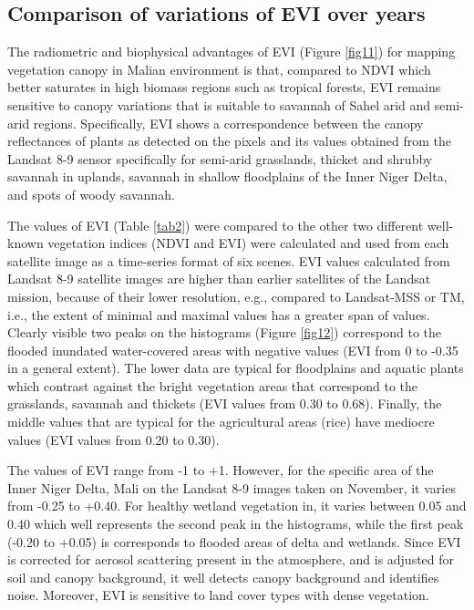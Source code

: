 \documentclass[12pt,a4paper,oneside]{article}
\def \newpar{\vspace{6pt}}
\begin{document}
\subsection*{Comparison of variations of EVI over years}

\newpar The radiometric and biophysical advantages of EVI (Figure \ref{fig11}) for mapping vegetation canopy in Malian environment is that, compared to NDVI which better saturates in high biomass regions such as tropical forests, EVI remains sensitive to canopy variations that is suitable to savannah of Sahel arid and semi-arid regions. Specifically, EVI shows a correspondence between the canopy reflectances of plants as detected on the pixels and its values obtained from the Landsat 8-9 sensor specifically for semi-arid grasslands, thicket and shrubby savannah in uplands, savannah in shallow floodplains of the Inner Niger Delta, and spots of woody savannah. 

\newpar The values of EVI (Table \ref{tab2}) were compared to the other two different well-known vegetation indices (NDVI and EVI) were calculated and used from each satellite image as a time-series format of six scenes. EVI values calculated from Landsat 8-9 satellite images are higher than earlier satellites of the Landsat mission, because of their lower resolution, e.g., compared to Landsat-MSS or TM, i.e., the extent of minimal and maximal values has a greater span of values. Clearly visible two peaks on the histograms (Figure \ref{fig12}) correspond to the flooded inundated water-covered areas with negative values (EVI from 0 to -0.35 in a general extent). The lower data are typical for floodplains and aquatic plants which contrast against the bright vegetation areas that correspond to the grasslands, savannah and thickets (EVI values from 0.30 to 0.68). Finally, the middle values that are typical for the agricultural areas (rice) have mediocre values (EVI values from 0.20 to 0.30). 

\newpar The values of EVI range from -1 to +1. However, for the specific area of the Inner Niger Delta, Mali on the Landsat 8-9 images taken on November, it varies from -0.25 to +0.40. For healthy wetland vegetation in, it varies between 0.05 and 0.40 which well represents the second peak in the histograms, while the first peak (-0.20 to +0.05) is corresponds to  flooded areas of delta and wetlands. Since EVI is corrected for aerosol scattering present in the atmosphere, and is adjusted for soil and canopy background, it well detects canopy background and identifies noise. Moreover, EVI is sensitive to land cover types with dense vegetation.
\end{document}
